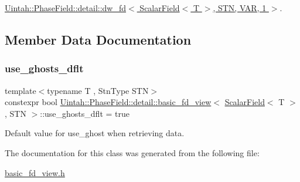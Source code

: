 \hyperlink{classUintah_1_1PhaseField_1_1detail_1_1dw__fd_3_01ScalarField_3_01T_01_4_00_01STN_00_01VAR_00_011_01_4_a403e762e621c14b27ecc024308b32b44}{Uintah\+::\+Phase\+Field\+::detail\+::dw\+\_\+fd$<$ Scalar\+Field$<$ T $>$, S\+T\+N, V\+A\+R, 1 $>$}.



\subsection{Member Data Documentation}
\mbox{\label{classUintah_1_1PhaseField_1_1detail_1_1basic__fd__view_3_01ScalarField_3_01T_01_4_00_01STN_01_4_a2faa49acca4f2f6983d318ae64e3ed39}} 
\subsubsection{\texorpdfstring{use\+\_\+ghosts\+\_\+dflt}{use\_ghosts\_dflt}}
{\footnotesize\ttfamily template$<$typename T , Stn\+Type S\+TN$>$ \\
constexpr bool \hyperlink{classUintah_1_1PhaseField_1_1detail_1_1basic__fd__view}{Uintah\+::\+Phase\+Field\+::detail\+::basic\+\_\+fd\+\_\+view}$<$ \hyperlink{structUintah_1_1PhaseField_1_1ScalarField}{Scalar\+Field}$<$ T $>$, S\+TN $>$\+::use\+\_\+ghosts\+\_\+dflt = true\hspace{0.3cm}{\ttfamily [static]}}



Default value for use\+\_\+ghost when retrieving data. 



The documentation for this class was generated from the following file\+:\begin{DoxyCompactItemize}
\item 
\hyperlink{basic__fd__view_8h}{basic\+\_\+fd\+\_\+view.\+h}\end{DoxyCompactItemize}
